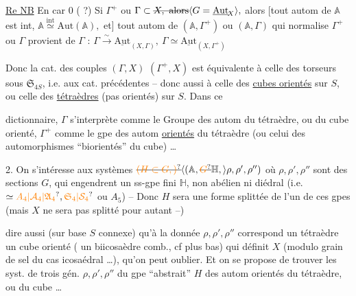 \deleted{\unsure{$\simeq$}} \uline{Re NB} En car $0$ ( ?) Si $\Gamma^{+}$ ou $\Gamma\subset\deleted{X,\ \text{alors}}\inserted{G=\underline{\mathrm{Aut}}_{\!X}},$ alors [tout autom de $\mathbb A$ est int, $\mathbb A\mathrel{\overset{\mathrm{int}}{\simeq}}\mathrm{Aut}(\mathbb A),$ et] tout autom de $(\mathbb A,\Gamma^{+})$ ou $(\mathbb A,\Gamma)$ qui normalise $\Gamma^{+}$ ou $\Gamma$ provient de $\Gamma$ : $\Gamma\xrightarrow{\sim}\underline{\mathrm{Aut}}_{(X,\Gamma)},\ \Gamma\simeq\underline{\mathrm{Aut}}_{(X,\Gamma^{+})}$

Donc la cat. des couples $(\Gamma,X)$ $(\Gamma^{+},X)$ est équivalente à celle des torseurs sous $\mathfrak S_{4S}$, i.e. aux cat. précédentes -- donc aussi à celle des \uline{cubes orientés} sur $S$, ou celle des \uline{tétraèdres} (pas  orientés) sur $S$. Dans ce


dictionnaire, $\Gamma$ s'interprète comme le  Groupe des autom du tétraèdre, ou du cube orienté, $\Gamma^{+}$ comme le gpe des autom \uline{orientés} du tétraèdre (ou celui des automorphismes ``biorientés'' du cube) \ldots

2. On s'intéresse  aux systèmes $\deleted{\unsure{(H\subset G,)}}\inserted{(\mathbb A,\deleted{\unsure{G}}\mathbb H,}\rho,\rho',\rho'')$ où $\rho,\rho',\rho''$ sont des sections   $G$,  qui engendrent un ss-gpe fini $\mathbb H$, non abélien ni diédral (i.e. $\simeq \unsure{A_4|\mathcal A_4|\mathfrak A_4},\unsure{\mathfrak S_4|\mathcal S_4}$ ou $A_5$) -- Donc $H$ sera une forme splittée de l'un de ces gpes (mais $X$  ne sera pas splitté pour autant --)


  dire aussi (sur base $S$ connexe) qu'à la donnée $\rho,\rho',\rho''$ correspond un tétraèdre   un cube orienté  ( un biicosaèdre comb., cf plus bas) qui définit $X$ (modulo grain de sel du cas icosaédral \ldots), qu'on peut oublier. Et on se propose de trouver les syst. de trois gén. $\rho,\rho',\rho''$ du gpe  ``abstrait'' $H$ des autom orientés du  tétraèdre, ou du cube \ldots\ 

